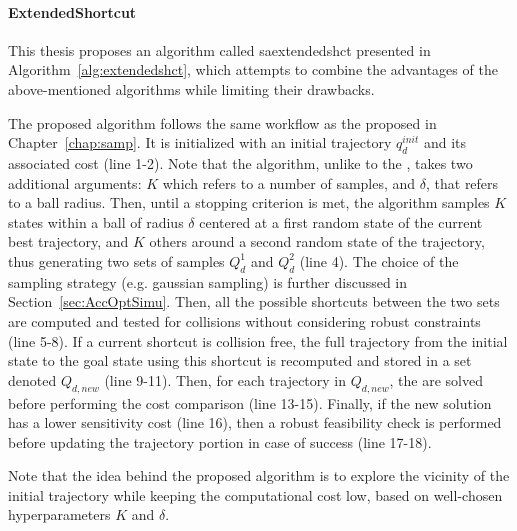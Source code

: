\paragraph{ExtendedShortcut}

This thesis proposes an algorithm called \gls{saextendedshct} presented in Algorithm~\ref{alg:extendedshct}, which attempts to combine the advantages of the above-mentioned algorithms while limiting their drawbacks.

The proposed algorithm follows the same workflow as the  proposed in Chapter~\ref{chap:samp}.
It is initialized with an initial trajectory $q_d^{init}$ and its associated cost (line 1-2).
Note that the algorithm, unlike to the , takes two additional arguments: $K$ which refers to a number of samples, and $\delta$, that refers to a ball radius.
Then, until a stopping criterion is met, the algorithm samples $K$ states within a ball of radius $\delta$ centered at a first random state of the current best trajectory, and $K$ others around a second random state of the trajectory, thus generating two sets of samples $Q_d^{1}$ and $Q_d^{2}$ (line 4).
The choice of the sampling strategy (e.g. gaussian sampling) is further discussed in Section~\ref{sec:AccOptSimu}.
Then, all the possible shortcuts between the two sets are computed and tested for collisions without considering robust constraints (line 5-8).
If a current shortcut is collision free, the full trajectory from the initial state to the goal state using this shortcut is recomputed and stored in a set denoted $Q_{d,new}$ (line 9-11).
Then, for each trajectory in $Q_{d,new}$, the  are solved before performing the cost comparison (line 13-15).
Finally, if the new solution has a lower sensitivity cost (line 16), then a robust feasibility check is performed before updating the trajectory portion in case of success (line 17-18).

Note that the idea behind the proposed algorithm is to explore the vicinity of the initial trajectory while keeping the computational cost low, based on well-chosen hyperparameters $K$ and $\delta$.

